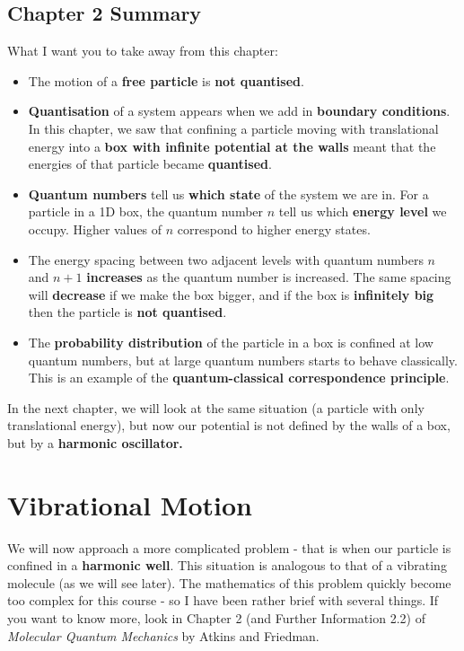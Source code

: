 \documentclass{memoir}[11pt,oneside,a4paper,openany]
\begin{document}
\section{Chapter 2 Summary}
What I want you to take away from this chapter:
\begin{itemize}
	\item The motion of a \textbf{free particle} is \textbf{not quantised}.
	\item \textbf{Quantisation} of a system appears when we add in \textbf{boundary conditions}. In this chapter, we saw that confining a particle moving with translational energy into a \textbf{box with infinite potential at the walls} meant that the energies of that particle became \textbf{quantised}.
	\item \textbf{Quantum numbers} tell us \textbf{which state} of the system we are in. For a particle in a 1D box, the quantum number $n$ tell us which \textbf{energy level} we occupy. Higher values of $n$ correspond to higher energy states.
	\item The energy spacing between two adjacent levels with quantum numbers $n$ and $n+1$ \textbf{increases} as the quantum number is increased. The same spacing will \textbf{decrease} if we make the box bigger, and if the box is \textbf{infinitely big} then the particle is \textbf{not quantised}.
	\item The \textbf{probability distribution} of the particle in a box is confined at low quantum numbers, but at large quantum numbers starts to behave classically. This is an example of the \textbf{quantum-classical correspondence principle}.
\end{itemize}
In the next chapter, we will look at the same situation (a particle with only translational energy), but now our potential is not defined by the walls of a box, but by a \textbf{harmonic oscillator.}

\chapter{Vibrational Motion}
We will now approach a more complicated problem - that is when our particle is confined in a \textbf{harmonic well}. This situation is analogous to that of a vibrating molecule (as we will see later). The mathematics of this problem quickly become too complex for this course - so I have been rather brief with several things. If you want to know more, look in Chapter 2 (and Further Information 2.2) of \emph{Molecular Quantum Mechanics} by Atkins and Friedman.
\end{document}

